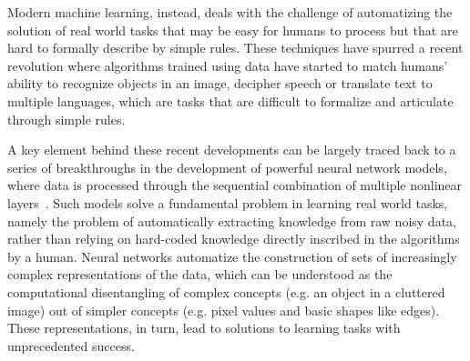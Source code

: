 \documentclass[twocolumn,english,reprint,superscriptaddress,longbibliography,pra]{revtex4-1}
\begin{document}
Modern machine learning, instead, deals with the challenge of automatizing the solution of real world tasks that may be easy for humans to process but that are hard to formally describe by simple rules. These techniques have spurred a recent revolution where algorithms trained using data have  started to match humans' ability to recognize objects in an image, decipher speech or translate text to multiple languages, which are tasks that are difficult to formalize and articulate through simple rules. 

A key element behind these recent developments can be largely traced back to a series of breakthroughs in the development of powerful neural network models, where data is processed through the sequential combination of multiple nonlinear layers~\cite{Goodfellow-et-al-2016}. Such models solve a fundamental problem in learning real world tasks, namely the problem of automatically extracting knowledge from raw noisy data, rather than relying on hard-coded knowledge directly inscribed in the algorithms by a human. Neural networks automatize the construction of sets of increasingly complex representations of the data, which can be understood as the computational disentangling of complex concepts (e.g. an object in a cluttered image) out of simpler concepts (e.g. pixel values and basic shapes like edges). These representations, in turn, lead to solutions to learning tasks with unprecedented success. 
\end{document}
